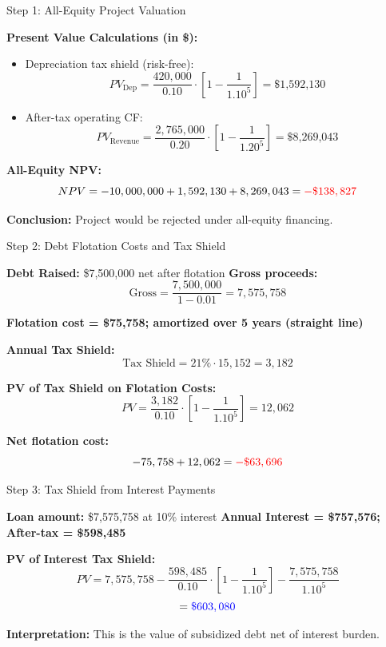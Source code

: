 \begin{frame}{Step 1: All-Equity Project Valuation}
	
	\textbf{Present Value Calculations (in \$):}
	\begin{itemize}
		\item Depreciation tax shield (risk-free):
		\[
		PV_{\text{Dep}} = \frac{420{,}000}{0.10} \cdot \left[1 - \frac{1}{1.10^5}\right] = \text{\$1,592,130}
		\]
		\item After-tax operating CF:
		\[
		PV_{\text{Revenue}} = \frac{2,765{,}000}{0.20} \cdot \left[1 - \frac{1}{1.20^5}\right] = \text{\$8,269,043}
		\]
	\end{itemize}
	
	\vspace{2mm}
	\textbf{All-Equity NPV:}
	\[
	NPV = -10,000,000 + 1,592,130 + 8,269,043 = \textcolor{red}{-\$138,827}
	\]
	
	\textbf{Conclusion:} Project would be rejected under all-equity financing.
	
\end{frame}

\begin{frame}{Step 2: Debt Flotation Costs and Tax Shield}
	
	\textbf{Debt Raised:} \$7,500,000 net after flotation  
	\textbf{Gross proceeds:}
	\[
	\text{Gross} = \frac{7,500,000}{1 - 0.01} = 7,575,758
	\]
	
	\textbf{Flotation cost = \$75,758; amortized over 5 years (straight line)}
	
	\vspace{1mm}
	\textbf{Annual Tax Shield:}
	\[
	\text{Tax Shield} = 21\% \cdot 15,152 = 3,182
	\]
	
	\textbf{PV of Tax Shield on Flotation Costs:}
	\[
	PV = \frac{3,182}{0.10} \cdot \left[1 - \frac{1}{1.10^5}\right] = 12,062
	\]
	
	\textbf{Net flotation cost:}
	\[
	-75,758 + 12,062 = \textcolor{red}{-\$63,696}
	\]
	
\end{frame}

\begin{frame}{Step 3: Tax Shield from Interest Payments}
	
	\textbf{Loan amount:} \$7,575,758 at 10\% interest  
	\textbf{Annual Interest = \$757,576; After-tax = \$598,485}
	
	\vspace{2mm}
	\textbf{PV of Interest Tax Shield:}
	\[
	PV = 7,575,758 - \frac{598,485}{0.10} \cdot \left[1 - \frac{1}{1.10^5}\right] - \frac{7,575,758}{1.10^5}
	\]
	\[
	= \textcolor{blue}{\$603,080}
	\]
	
	\textbf{Interpretation:} This is the value of subsidized debt net of interest burden.
	
\end{frame}

